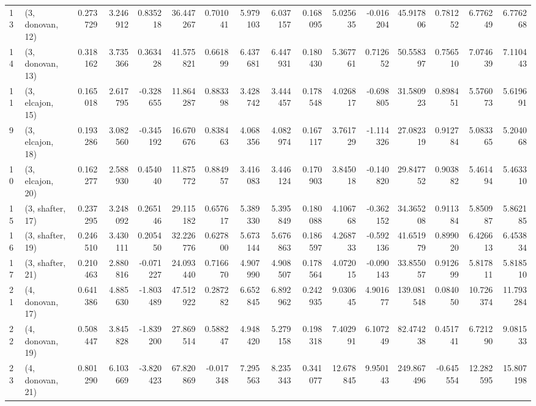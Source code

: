 \begin{tabular}{llrrrrrrrrrrrrrr}
13 &  (3, donovan, 12) &   0.273729 &  3.246912 &  0.835218 &  36.447267 &  0.701041 &   5.979103 &  6.037157 &  0.168095 &   5.025635 & -0.016204 &   45.917806 &  0.781252 &   6.776249 &   6.776268 \\
14 &  (3, donovan, 13) &   0.318162 &  3.735366 &  0.363428 &  41.575821 &  0.661899 &   6.437681 &  6.447931 &  0.180430 &   5.367761 &  0.712652 &   50.558397 &  0.756510 &   7.074639 &   7.110443 \\
11 &  (3, elcajon, 15) &   0.165018 &  2.617795 & -0.328655 &  11.864287 &  0.883398 &   3.428742 &  3.444457 &  0.178548 &   4.026817 & -0.698805 &   31.580923 &  0.898451 &   5.576073 &   5.619691 \\
9  &  (3, elcajon, 18) &   0.193286 &  3.082560 & -0.345192 &  16.670676 &  0.838463 &   4.068356 &  4.082974 &  0.167117 &   3.761729 & -1.114326 &   27.082319 &  0.912784 &   5.083365 &   5.204068 \\
10 &  (3, elcajon, 20) &   0.162277 &  2.588930 &  0.454040 &  11.875772 &  0.884957 &   3.416083 &  3.446124 &  0.170903 &   3.845018 & -0.140820 &   29.847752 &  0.903882 &   5.461494 &   5.463310 \\
15 &  (3, shafter, 17) &   0.237295 &  3.248092 &  0.265146 &  29.115182 &  0.657617 &   5.389330 &  5.395849 &  0.180088 &   4.106768 & -0.362152 &   34.365208 &  0.911384 &   5.850987 &   5.862185 \\
16 &  (3, shafter, 19) &   0.246510 &  3.430111 &  0.205450 &  32.226776 &  0.627800 &   5.673144 &  5.676863 &  0.186597 &   4.268733 & -0.592136 &   41.651979 &  0.899020 &   6.426613 &   6.453834 \\
17 &  (3, shafter, 21) &   0.210463 &  2.880816 & -0.071227 &  24.093440 &  0.716670 &   4.907990 &  4.908507 &  0.178564 &   4.072015 & -0.090143 &   33.855057 &  0.912699 &   5.817811 &   5.818510 \\
21 &  (4, donovan, 17) &   0.641386 &  4.885630 & -1.803489 &  47.512922 &  0.287282 &   6.652845 &  6.892962 &  0.242935 &   9.030645 &  4.901677 &  139.081548 &  0.084050 &  10.726374 &  11.793284 \\
22 &  (4, donovan, 19) &   0.508447 &  3.845828 & -1.839200 &  27.869514 &  0.588247 &   4.948420 &  5.279158 &  0.198318 &   7.402991 &  6.107249 &   82.474238 &  0.451741 &   6.721290 &   9.081533 \\
23 &  (4, donovan, 21) &   0.801290 &  6.103669 & -3.820423 &  67.820869 & -0.017348 &   7.295563 &  8.235343 &  0.341077 &  12.678845 &  9.950143 &  249.867496 & -0.645554 &  12.282595 &  15.807198 \\

\end{tabular}
